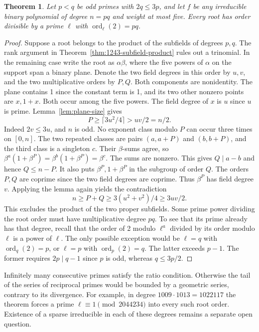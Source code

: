 \documentclass[11pt]{article}
\newtheorem{theorem}{Theorem}
\newcommand{\ord}{\operatorname{ord}}
\begin{document}
\begin{theorem}\label{thm:close-semiprimes}
Let \(p<q\) be odd primes with \(2q\le3p\), and let \(f\) be any
irreducible binary polynomial of degree \(n=pq\) and weight at most
five. Every root has order divisible by a prime \(\ell\) with
\(\ord_\ell(2)=pq\).
\end{theorem}
\begin{proof}
Suppose a root belongs to the product of the subfields of degrees
\(p,q\). The rank argument in Theorem~\ref{thm:1243-subfield-product}
rules out a trinomial. In the remaining case write the root as
\(\alpha\beta\), where the five powers of \(\alpha\) on the support span
a binary plane. Denote the two field degrees in this order by \(u,v\),
and the two multiplicative orders by \(P,Q\). Both components are
nonidentity. The plane contains 1 since the constant term is 1,
and its two other nonzero points are \(x,1+x\). Both occur among
the five powers. The field degree of \(x\) is \(u\) since \(u\)
is prime. Lemma~\ref{lem:plane-size} gives
\[
            P\ge\lceil 3u^2/4\rceil>uv/2=n/2 .
\]
Indeed \(2v\le3u\), and \(n\) is odd.
No exponent class modulo \(P\) can occur three times on \([0,n]\).
The two repeated classes are pairs \((a,a+P)\) and \((b,b+P)\),
and the third class is a singleton \(c\). Their \(\beta\)-sums agree,
so \(\beta^a(1+\beta^P)=\beta^b(1+\beta^P)=\beta^c\).
The sums are nonzero. This gives \(Q\mid a-b\) and hence
\(Q\le n-P\). It also puts \(\beta^P,1+\beta^P\) in the subgroup
of order \(Q\). The orders \(P,Q\) are coprime since the two field
degrees are coprime. Thus \(\beta^P\) has field degree \(v\).
Applying the lemma again yields the contradiction
\[
          n\ge P+Q\ge 3(u^2+v^2)/4\ge 3uv/2 .
\]
This excludes the product of the two proper subfields. Some prime
power dividing the root order must have multiplicative degree \(pq\).
To see that its prime already has that degree, recall that the order
of 2 modulo \(\ell^a\) divided by its order modulo \(\ell\) is a
power of \(\ell\). The only possible exception would be \(\ell=q\)
with \(\ord_q(2)=p\), or \(\ell=p\) with \(\ord_p(2)=q\).
The latter exceeds \(p-1\). The former requires \(2p\mid q-1\)
since \(p\) is odd, whereas \(q\le3p/2\).
\end{proof}

Infinitely many consecutive primes satisfy the ratio condition.
Otherwise the tail of the series of reciprocal primes would be
bounded by a geometric series, contrary to its divergence. For
example, in degree \(1009\cdot1013=1022117\) the theorem forces
a prime \(\ell\equiv1\pmod{2044234}\) into every such root order.
Existence of a sparse irreducible in each of these degrees remains a
separate open question.
\end{document}
